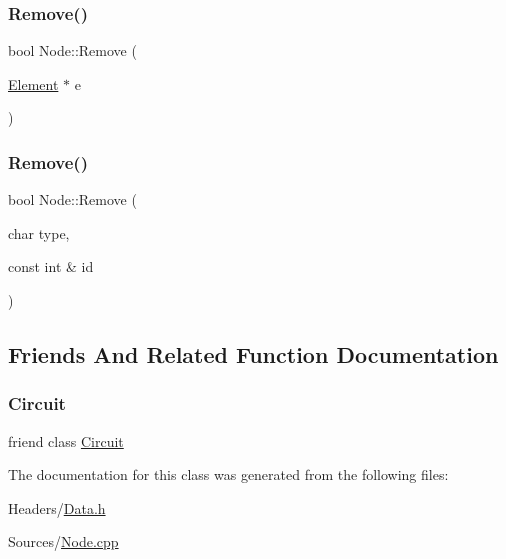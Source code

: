 \mbox{\label{class_node_ab274bc3fa4b13b1348cc7736b497eef0}} 
\subsubsection{\texorpdfstring{Remove()}{Remove()}\hspace{0.1cm}{\footnotesize\ttfamily [1/2]}}
{\footnotesize\ttfamily bool Node\+::\+Remove (\begin{DoxyParamCaption}\item[{\hyperlink{class_element}{Element} $\ast$}]{e }\end{DoxyParamCaption})}

\mbox{\label{class_node_aa3ed7f9b891a39c3fb8661316af413ea}} 
\subsubsection{\texorpdfstring{Remove()}{Remove()}\hspace{0.1cm}{\footnotesize\ttfamily [2/2]}}
{\footnotesize\ttfamily bool Node\+::\+Remove (\begin{DoxyParamCaption}\item[{char}]{type,  }\item[{const int \&}]{id }\end{DoxyParamCaption})}



\subsection{Friends And Related Function Documentation}
\mbox{\label{class_node_a120b136c2c9bc1938e0cd2cca80d91e4}} 
\subsubsection{\texorpdfstring{Circuit}{Circuit}}
{\footnotesize\ttfamily friend class \hyperlink{class_circuit}{Circuit}\hspace{0.3cm}{\ttfamily [friend]}}



The documentation for this class was generated from the following files\+:\begin{DoxyCompactItemize}
\item 
Headers/\hyperlink{_data_8h}{Data.\+h}\item 
Sources/\hyperlink{_node_8cpp}{Node.\+cpp}\end{DoxyCompactItemize}
